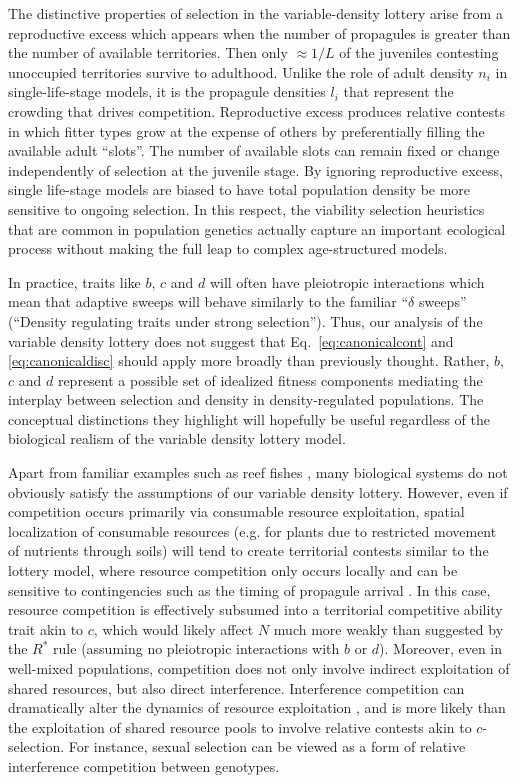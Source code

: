 \documentclass[12pt]{article}
\begin{document}
The distinctive properties of selection in the variable-density lottery arise from a reproductive excess which appears when the number of propagules is greater than the number of available territories. Then only $\approx 1/L$ of the juveniles contesting unoccupied territories survive to adulthood. Unlike the role of adult density $n_i$ in single-life-stage models, it is the propagule densities $l_i$ that represent the crowding that drives competition. Reproductive excess produces relative contests in which fitter types grow at the expense of others by preferentially filling the available adult ``slots''. The number of available slots can remain fixed or change independently of selection at the juvenile stage. By ignoring reproductive excess, single life-stage models are biased to have total population density be more sensitive to ongoing selection. In this respect, the viability selection heuristics that are common in population genetics \cite[pp. 61]{gillespie_2004} actually capture an important ecological process without making the full leap to complex age-structured models.

In practice, traits like $b$, $c$ and $d$ will often have pleiotropic interactions which mean that adaptive sweeps will behave similarly to the familiar ``$\delta$ sweeps'' (``Density regulating traits under strong selection''). Thus, our analysis of the variable density lottery does not suggest that Eq.~\eqref{eq:canonicalcont} and \eqref{eq:canonicaldisc} should apply more broadly than previously thought. Rather, $b$, $c$ and $d$ represent a possible set of idealized fitness components mediating the interplay between selection and density in density-regulated populations. The conceptual distinctions they highlight will hopefully be useful regardless of the biological realism of the variable density lottery model. 

Apart from familiar examples such as reef fishes \citep{chesson_1981}, many biological systems do not obviously satisfy the assumptions of our variable density lottery. However, even if competition occurs primarily via consumable resource exploitation, spatial localization of consumable resources (e.g. for plants due to restricted movement of nutrients through soils) will tend to create territorial contests similar to the lottery model, where resource competition only occurs locally and can be sensitive to contingencies such as the timing of propagule arrival \citep{bolker_99}. In this case, resource competition is effectively subsumed into a territorial competitive ability trait akin to $c$, which would likely affect $N$ much more weakly than suggested by the $R^*$ rule (assuming no pleiotropic interactions with $b$ or $d$). Moreover, even in well-mixed populations, competition does not only involve indirect exploitation of shared resources, but also direct interference. Interference competition can dramatically alter the dynamics of resource exploitation \citep{case_1974,amarasekare_2002}, and is more likely than the exploitation of shared resource pools to involve relative contests akin to $c$-selection. For instance, sexual selection can be viewed as a form of relative interference competition between genotypes. 
\end{document}
